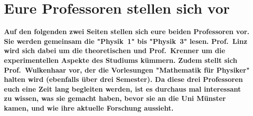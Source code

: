 \section[Eure Profs stellen sich vor]{Eure Professoren stellen sich vor}
\textbf{Auf den folgenden zwei Seiten stellen sich eure beiden Professoren vor.
    Sie werden gemeinsam die "Physik~1" bis "Physik~3" lesen.
    Prof.\ Linz wird sich dabei um die theoretischen und Prof.\ Krenner um die experimentellen Aspekte des Studiums kümmern.
    Zudem stellt sich Prof.\ Wulkenhaar vor, der die Vorlesungen "Mathematik für Physiker" halten wird (ebenfalls über drei Semester).
	Da diese drei Professoren euch eine Zeit lang begleiten werden, ist es durchaus mal interessant zu wissen, was sie gemacht haben, bevor sie an die Uni Münster kamen, und wie ihre aktuelle Forschung aussieht.}

